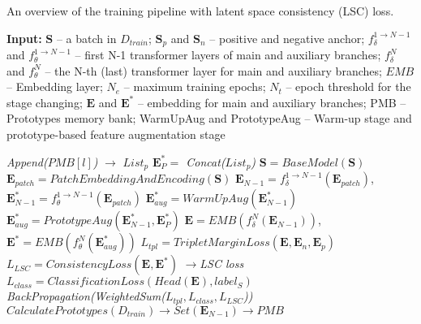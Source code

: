 \documentclass[lettersize,journal]{IEEEtran}
\begin{document}
\begin{algorithm}[t]
    \caption{An overview of the training pipeline with latent space consistency (LSC) loss.}
    \label{algorithm1}
    \renewcommand{\thealgorithm}{}
  
    \begin{algorithmic}[1]
        \small{
            \STATEx \textbf{Input:}  $\textbf{S}$ -- a batch in $D_{train}$; $\textbf{S}_{p}$ and $\textbf{S}_{n}$ -- positive and negative anchor;  $f_{\delta}^{1 \to N-1}$ and $f_{\theta}^{1 \to N-1}$ --  first N-1 transformer layers of main and auxiliary branches; $f_{\delta}^N$ and $f_{\theta}^N$ -- the N-th (last) transformer layer for main and auxiliary branches; $EMB$ -- Embedding layer; $N_e$ -- maximum training epochs; $N_t$ -- epoch threshold for the stage changing; $\textbf{E}$ and $\textbf{E}^*$ -- embedding for main and auxiliary branches; PMB -- Prototypes memory bank; WarmUpAug and PrototypeAug -- Warm-up stage and prototype-based feature augmentation stage
            
        }
                \textit{Append($PMB[l]$)} $\to$ \textit{$List_p$}
                \ENDFOR
                \STATE \textit{$\textbf{E}_{P}^* =$ Concat($List_p$)}
                \ENDIF
         $\textbf{S}=BaseModel(\textbf{S})$ \ENDIF
        \STATE $\textbf{E}_{patch} = PatchEmbeddingAndEncoding(\textbf{S})$
        \STATE $\textbf{E}_{N-1} = f_{\delta}^{1 \to N-1}(\textbf{E}_{patch})$, $\textbf{E}_{N-1}^*={f_{\theta}^{1 \to N-1}}(\textbf{E}_{patch})$
         $\textbf{E}_{aug}^* = WarmUpAug(\textbf{E}_{N-1}^*)$ \ELSE~ {$\textbf{E}_{aug}^* = PrototypeAug(\textbf{E}_{N-1}^*, \textbf{E}_{P}^*)$} \ENDIF
        \STATE $\textbf{E}=EMB({f_{\delta}^{ N}}(\textbf{E}_{N-1}))$, $\textbf{E}^*=EMB({f_{\theta}^{ N}}(\textbf{E}_{aug}^*))$
        \STATE $L_{tpl}=TripletMarginLoss(\textbf{E}, \textbf{E}_n, \textbf{E}_p)$
        \STATE $L_{LSC}=ConsistencyLoss(\textbf{E}, \textbf{E}^*)$ \textit{$\rightarrow$LSC loss}
        \STATE $L_{class}=ClassificationLoss(Head(\textbf{E}), label_S)$
        \STATE \textit{BackPropagation(WeightedSum($L_{tpl},L_{class},L_{LSC}$))}
        \ENDFOR
        \STATE $CalculatePrototypes(D_{train})\to Set(\textbf{E}_{N-1})\to PMB$
        \ENDIF
        \ENDFOR
    \end{algorithmic}
\end{algorithm}
\end{document}
